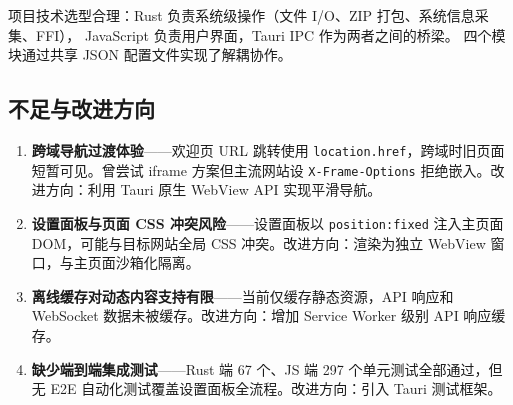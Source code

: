 \documentclass[12pt,a4paper]{ctexart}
\begin{document}
项目技术选型合理：Rust 负责系统级操作（文件 I/O、ZIP 打包、系统信息采集、FFI），
JavaScript 负责用户界面，Tauri IPC 作为两者之间的桥梁。
四个模块通过共享 JSON 配置文件实现了解耦协作。

\subsection{不足与改进方向}

\begin{enumerate}[label=(\arabic*)]
  \item \textbf{跨域导航过渡体验}——欢迎页 URL 跳转使用 \texttt{location.href}，跨域时旧页面短暂可见。曾尝试 iframe 方案但主流网站设 \texttt{X-Frame-Options} 拒绝嵌入。改进方向：利用 Tauri 原生 WebView API 实现平滑导航。

  \item \textbf{设置面板与页面 CSS 冲突风险}——设置面板以 \texttt{position:fixed} 注入主页面 DOM，可能与目标网站全局 CSS 冲突。改进方向：渲染为独立 WebView 窗口，与主页面沙箱化隔离。

  \item \textbf{离线缓存对动态内容支持有限}——当前仅缓存静态资源，API 响应和 WebSocket 数据未被缓存。改进方向：增加 Service Worker 级别 API 响应缓存。

  \item \textbf{缺少端到端集成测试}——Rust 端 67 个、JS 端 297 个单元测试全部通过，但无 E2E 自动化测试覆盖设置面板全流程。改进方向：引入 Tauri 测试框架。

\end{enumerate}
\end{document}
